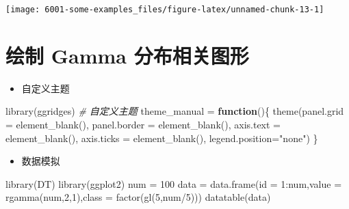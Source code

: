 \documentclass[
]{book}
\newenvironment{Shaded}{\begin{snugshade}}{\end{snugshade}}
\newcommand{\AttributeTok}[1]{\textcolor[rgb]{0.77,0.63,0.00}{#1}}
\newcommand{\CommentTok}[1]{\textcolor[rgb]{0.56,0.35,0.01}{\textit{#1}}}
\newcommand{\ControlFlowTok}[1]{\textcolor[rgb]{0.13,0.29,0.53}{\textbf{#1}}}
\newcommand{\DecValTok}[1]{\textcolor[rgb]{0.00,0.00,0.81}{#1}}
\newcommand{\FunctionTok}[1]{\textcolor[rgb]{0.00,0.00,0.00}{#1}}
\newcommand{\NormalTok}[1]{#1}
\newcommand{\OtherTok}[1]{\textcolor[rgb]{0.56,0.35,0.01}{#1}}
\newcommand{\SpecialCharTok}[1]{\textcolor[rgb]{0.00,0.00,0.00}{#1}}
\newcommand{\StringTok}[1]{\textcolor[rgb]{0.31,0.60,0.02}{#1}}
\providecommand{\tightlist}{%
  \setlength{\itemsep}{0pt}\setlength{\parskip}{0pt}}
\begin{document}
\begin{center}\texttt{[image: 6001-some-examples\_files/figure-latex/unnamed-chunk-13-1]} \end{center}

\hypertarget{ux7ed8ux5236-gamma-ux5206ux5e03ux76f8ux5173ux56feux5f62}{%
\section{绘制 Gamma 分布相关图形}\label{ux7ed8ux5236-gamma-ux5206ux5e03ux76f8ux5173ux56feux5f62}}

\begin{itemize}
\tightlist
\item
  自定义主题
\end{itemize}

\begin{Shaded}
\begin{Highlighting}[]
\FunctionTok{library}\NormalTok{(ggridges)}
\CommentTok{\# 自定义主题}
\NormalTok{theme\_manual }\OtherTok{=} \ControlFlowTok{function}\NormalTok{()\{ }
    \FunctionTok{theme}\NormalTok{(}\AttributeTok{panel.grid =} \FunctionTok{element\_blank}\NormalTok{(),}
          \AttributeTok{panel.border =} \FunctionTok{element\_blank}\NormalTok{(),}
          \AttributeTok{axis.text =} \FunctionTok{element\_blank}\NormalTok{(),}
          \AttributeTok{axis.ticks =} \FunctionTok{element\_blank}\NormalTok{(),}
          \AttributeTok{legend.position=}\StringTok{"none"}\NormalTok{) }
\NormalTok{\}}
\end{Highlighting}
\end{Shaded}

\begin{itemize}
\tightlist
\item
  数据模拟
\end{itemize}

\begin{Shaded}
\begin{Highlighting}[]
\FunctionTok{library}\NormalTok{(DT)}
\FunctionTok{library}\NormalTok{(ggplot2)}
\NormalTok{num }\OtherTok{=} \DecValTok{100}
\NormalTok{data }\OtherTok{=} \FunctionTok{data.frame}\NormalTok{(}\StringTok{\textquotesingle{}id\textquotesingle{}} \OtherTok{=} \DecValTok{1}\SpecialCharTok{:}\NormalTok{num,}\StringTok{\textquotesingle{}value\textquotesingle{}} \OtherTok{=} \FunctionTok{rgamma}\NormalTok{(num,}\DecValTok{2}\NormalTok{,}\DecValTok{1}\NormalTok{),}\StringTok{\textquotesingle{}class\textquotesingle{}} \OtherTok{=} \FunctionTok{factor}\NormalTok{(}\FunctionTok{gl}\NormalTok{(}\DecValTok{5}\NormalTok{,num}\SpecialCharTok{/}\DecValTok{5}\NormalTok{)))}
\FunctionTok{datatable}\NormalTok{(data)}
\end{Highlighting}
\end{Shaded}
\end{document}
